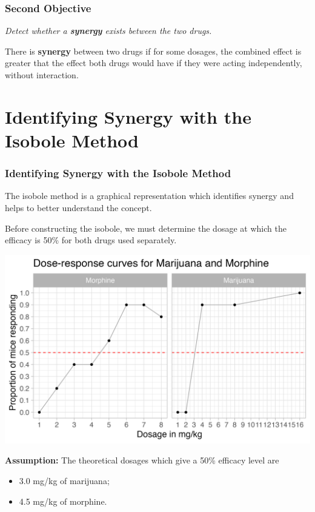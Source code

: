 \documentclass[14pt]{beamer}
\begin{document}
\begin{frame}
\frametitle{Second Objective}
\textit{Detect whether a \textbf{synergy} exists between the two drugs.}

\bigskip

There is \textbf{synergy} between two drugs if for some dosages, the combined effect is greater that the effect both drugs would have if they were acting independently, without interaction.
\end{frame}


\section{Identifying Synergy with the Isobole Method}
\begin{frame}
\frametitle{Identifying Synergy with the Isobole Method}
The isobole method is a graphical representation which identifies synergy and helps to better understand the concept.

\bigskip

Before constructing the isobole, we must determine the dosage at which the efficacy is 50\% for both drugs used separately.
\end{frame}

\begin{frame}
\begin{center}
\includegraphics[scale=0.6]{dose-response.png}
\end{center}
\end{frame}

\begin{frame}
\textbf{Assumption:} The theoretical dosages which give a 50\% efficacy level are 
\begin{itemize}[label={$\blacktriangleright$}]
\item 3.0 mg/kg of marijuana;
\item 4.5 mg/kg of morphine.
\end{itemize}
\end{frame}
\end{document}
